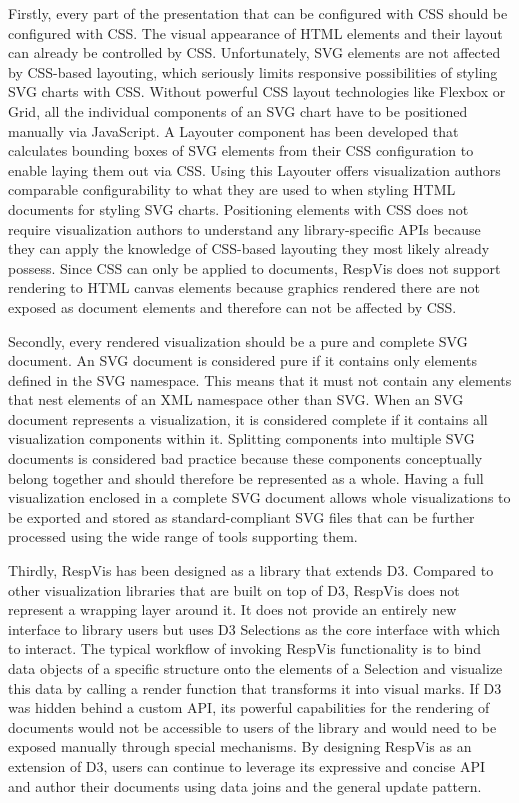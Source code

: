 Firstly, every part of the presentation that can be configured with CSS should be configured with CSS.
The visual appearance of HTML elements and their layout can already be controlled by CSS.
Unfortunately, SVG elements are not affected by CSS-based layouting, which seriously limits responsive possibilities of styling SVG charts with CSS.
Without powerful CSS layout technologies like Flexbox or Grid, all the individual components of an SVG chart have to be positioned manually via JavaScript.
A Layouter component has been developed that calculates bounding boxes of SVG elements from their CSS configuration to enable laying them out via CSS.
Using this Layouter offers visualization authors comparable configurability to what they are used to when styling HTML documents for styling SVG charts.
Positioning elements with CSS does not require visualization authors to understand any library-specific APIs because they can apply the knowledge of CSS-based layouting they most likely already possess.
Since CSS can only be applied to documents, RespVis does not support rendering to HTML canvas elements because graphics rendered there are not exposed as document elements and therefore can not be affected by CSS.

Secondly, every rendered visualization should be a pure and complete SVG document.
An SVG document is considered pure if it contains only elements defined in the SVG namespace.
This means that it must not contain any  elements that nest elements of an XML namespace other than SVG.
When an SVG document represents a visualization, it is considered complete if it contains all visualization components within it.
Splitting components into multiple SVG documents is considered bad practice because these components conceptually belong together and should therefore be represented as a whole.
Having a full visualization enclosed in a complete SVG document allows whole visualizations to be exported and stored as standard-compliant SVG files that can be further processed using the wide range of tools supporting them.

Thirdly, RespVis has been designed as a library that extends D3.
Compared to other visualization libraries that are built on top of D3, RespVis does not represent a wrapping layer around it.
It does not provide an entirely new interface to library users but uses D3 Selections as the core interface with which to interact.
The typical workflow of invoking RespVis functionality is to bind data objects of a specific structure onto the elements of a Selection and visualize this data by calling a render function that transforms it into visual marks.
If D3 was hidden behind a custom API, its powerful capabilities for the rendering of documents would not be accessible to users of the library and would need to be exposed manually through special mechanisms. 
By designing RespVis as an extension of D3, users can continue to leverage its expressive and concise API and author their documents using data joins and the general update pattern.

